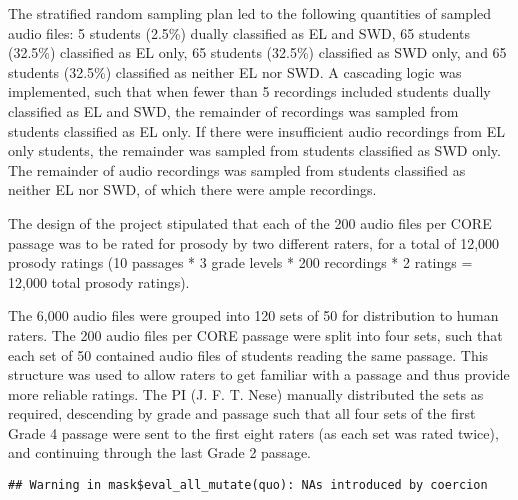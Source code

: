 \documentclass[
]{article}
\begin{document}
The stratified random sampling plan led to the following quantities of
sampled audio files: 5 students (2.5\%) dually classified as EL and SWD,
65 students (32.5\%) classified as EL only, 65 students (32.5\%)
classified as SWD only, and 65 students (32.5\%) classified as neither
EL nor SWD. A cascading logic was implemented, such that when fewer than
5 recordings included students dually classified as EL and SWD, the
remainder of recordings was sampled from students classified as EL only.
If there were insufficient audio recordings from EL only students, the
remainder was sampled from students classified as SWD only. The
remainder of audio recordings was sampled from students classified as
neither EL nor SWD, of which there were ample recordings.

The design of the project stipulated that each of the 200 audio files
per CORE passage was to be rated for prosody by two different raters,
for a total of 12,000 prosody ratings (10 passages * 3 grade levels *
200 recordings * 2 ratings = 12,000 total prosody ratings).

The 6,000 audio files were grouped into 120 sets of 50 for distribution
to human raters. The 200 audio files per CORE passage were split into
four sets, such that each set of 50 contained audio files of students
reading the same passage. This structure was used to allow raters to get
familiar with a passage and thus provide more reliable ratings. The PI
(J. F. T. Nese) manually distributed the sets as required, descending by
grade and passage such that all four sets of the first Grade 4 passage
were sent to the first eight raters (as each set was rated twice), and
continuing through the last Grade 2 passage.

\begin{verbatim}
## Warning in mask$eval_all_mutate(quo): NAs introduced by coercion
\end{verbatim}
\end{document}
